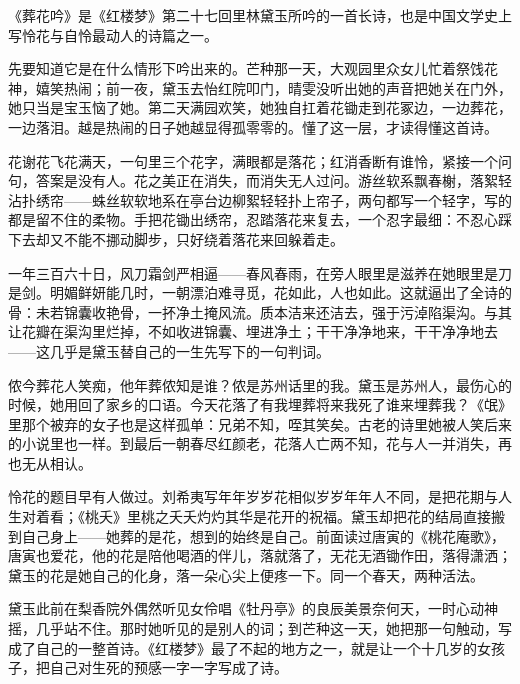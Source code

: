 \begin{appreciation}
《葬花吟》是《红楼梦》第二十七回里林黛玉所吟的一首长诗，也是中国文学史上写怜花与自怜最动人的诗篇之一。

先要知道它是在什么情形下吟出来的。芒种那一天，大观园里众女儿忙着祭饯花神，嬉笑热闹；前一夜，黛玉去怡红院叩门，晴雯没听出她的声音把她关在门外，她只当是宝玉恼了她。第二天满园欢笑，她独自扛着花锄走到花冢边，一边葬花，一边落泪。越是热闹的日子她越显得孤零零的。懂了这一层，才读得懂这首诗。

花谢花飞花满天，一句里三个花字，满眼都是落花；红消香断有谁怜，紧接一个问句，答案是没有人。花之美正在消失，而消失无人过问。游丝软系飘春榭，落絮轻沾扑绣帘——蛛丝软软地系在亭台边柳絮轻轻扑上帘子，两句都写一个轻字，写的都是留不住的柔物。手把花锄出绣帘，忍踏落花来复去，一个忍字最细：不忍心踩下去却又不能不挪动脚步，只好绕着落花来回躲着走。

一年三百六十日，风刀霜剑严相逼——春风春雨，在旁人眼里是滋养在她眼里是刀是剑。明媚鲜妍能几时，一朝漂泊难寻觅，花如此，人也如此。这就逼出了全诗的骨：未若锦囊收艳骨，一抔净土掩风流。质本洁来还洁去，强于污淖陷渠沟。与其让花瓣在渠沟里烂掉，不如收进锦囊、埋进净土；干干净净地来，干干净净地去——这几乎是黛玉替自己的一生先写下的一句判词。

侬今葬花人笑痴，他年葬侬知是谁？侬是苏州话里的我。黛玉是苏州人，最伤心的时候，她用回了家乡的口语。今天花落了有我埋葬将来我死了谁来埋葬我？《氓》里那个被弃的女子也是这样孤单：兄弟不知，咥其笑矣。古老的诗里她被人笑后来的小说里也一样。到最后一朝春尽红颜老，花落人亡两不知，花与人一并消失，再也无从相认。

怜花的题目早有人做过。刘希夷写年年岁岁花相似岁岁年年人不同，是把花期与人生对着看；《桃夭》里桃之夭夭灼灼其华是花开的祝福。黛玉却把花的结局直接搬到自己身上——她葬的是花，想到的始终是自己。前面读过唐寅的《桃花庵歌》，唐寅也爱花，他的花是陪他喝酒的伴儿，落就落了，无花无酒锄作田，落得潇洒；黛玉的花是她自己的化身，落一朵心尖上便疼一下。同一个春天，两种活法。

黛玉此前在梨香院外偶然听见女伶唱《牡丹亭》的良辰美景奈何天，一时心动神摇，几乎站不住。那时她听见的是别人的词；到芒种这一天，她把那一句触动，写成了自己的一整首诗。《红楼梦》最了不起的地方之一，就是让一个十几岁的女孩子，把自己对生死的预感一字一字写成了诗。
\end{appreciation}
